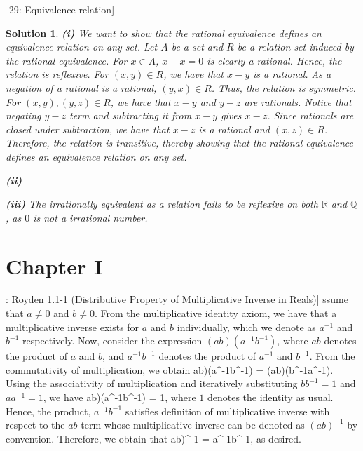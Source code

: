 \documentclass{article} %
\def\eQb#1\eQe{\begin{eqnarray*}#1\end{eqnarray*}}
\def\Qb#1\Qe{\begin{question}#1\end{question}}
\def\Sb#1\Se{\begin{solution}#1\end{solution}}
\theoremstyle{quest}
\newtheorem*{question}{Question}
\newtheorem*{solution}{Solution}
\begin{document}
\bigskip

\Qb[2.6-29: Equivalence relation]
\Qe
\begin{solution}
\textbf{(i)} We want to show that the rational equivalence defines an equivalence 
relation on any set. Let $A$ be a set and $R$ be a relation set induced by 
the rational equivalence. For $x \in A$, $x - x = 0$ is clearly a rational.
Hence, the relation is reflexive. For $(x,y) \in R$, we have that $x-y$ is a rational.
As a negation of a rational is a rational, $(y,x) \in R$. Thus, the relation is symmetric.
For $(x,y), (y,z) \in R$, we have that $x-y$ and $y-z$ are rationals. Notice that
negating $y-z$ term and subtracting it from $x-y$ gives $x-z$. Since rationals are closed
under subtraction, we have that $x-z$ is a rational and $(x,z) \in R$. Therefore, the relation
is transitive, thereby showing that the rational equivalence defines an equivalence relation 
on any set. \\

\smallskip

\textbf{(ii)} 

\smallskip

\textbf{(iii)} The irrationally equivalent as a relation fails to be reflexive on both 
$\mathbb{R}$ and $\mathbb{Q}$, as $0$ is not a irrational number.

\end{solution}


\section{Chapter I}

\Qb[: Royden 1.1-1 (Distributive Property of Multiplicative Inverse in Reals)]
\Qe
\Sb
Assume that $a \neq 0$ and $b \neq 0$. From the multiplicative identity axiom,
we have that a multiplicative inverse exists for $a$ and $b$ individually, which we denote as
$a^{-1}$ and $b^{-1}$ respectively.
Now, consider the expression $(ab)(a^{-1}b^{-1})$, where $ab$ denotes the 
product of $a$ and $b$, and $a^{-1}b^{-1}$ denotes the product of $a^{-1}$ and $b^{-1}$.
From the commutativity of multiplication,
we obtain
\eQb
(ab)(a^{-1}b^{-1}) = (ab)(b^{-1}a^{-1}).
\eQe
Using the associativity of multiplication and iteratively substituting $bb^{-1} = 1$ and $aa^{-1} = 1$,
we have
\eQb
(ab)(a^{-1}b^{-1}) = 1,
\eQe
where $1$ denotes the identity as usual. Hence, the product, $a^{-1}b^{-1}$ satisfies definition
of multiplicative inverse with respect to the $ab$ term whose multiplicative inverse can be denoted
as $(ab)^{-1}$ by convention. Therefore, we obtain that
\eQb
(ab)^{-1} = a^{-1}b^{-1},
\eQe
as desired.
\Se
\end{document}
